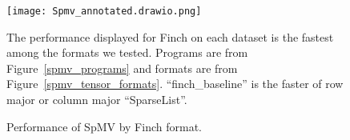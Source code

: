   
  
  
  
  
  
  \begin{figure}
      \texttt{[image: Spmv\_annotated.drawio.png]}
      \vspace{-18pt}
      \caption{Performance of SpMV by Finch format.}
      \label{fig:spmv_grouped}
      \footnotesize The performance displayed for Finch on each dataset is the fastest among the formats we tested. Programs are from Figure~\ref{spmv_programs} and formats are from Figure~\ref{spmv_tensor_formats}. ``finch\_baseline'' is the faster of row major or column major ``SparseList''.
  \end{figure}